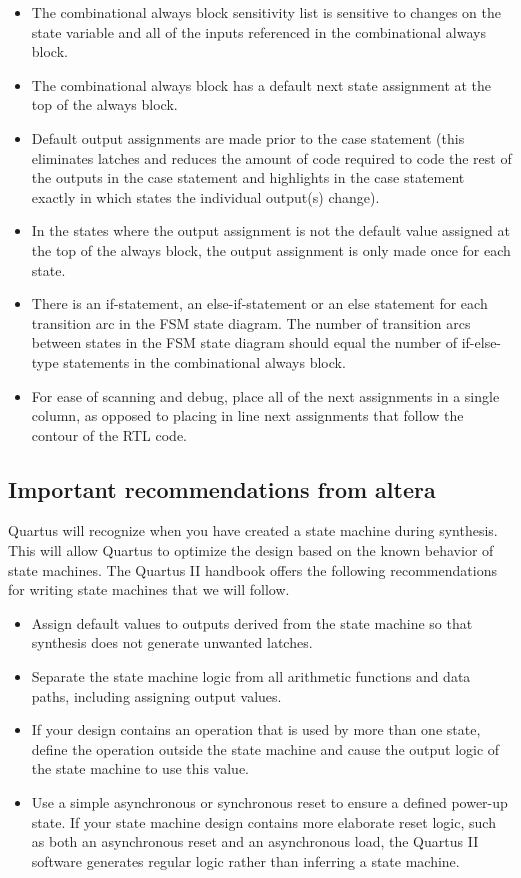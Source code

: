       \begin{itemize}
        \item The combinational always block sensitivity list is sensitive to changes on the state variable and all of the inputs referenced in the combinational always block.
        \item The combinational always block has a default next state assignment at the top of the always block.
        \item Default output assignments are made prior to the case statement (this eliminates latches and reduces the amount of code required to code the rest of the outputs in the case statement and highlights in the case statement exactly in which states the individual output(s) change).
        \item In the states where the output assignment is not the default value assigned at the top of the always block, the output assignment is only made once for each state.
        \item There is an if-statement, an else-if-statement or an else statement for each transition arc in the FSM state diagram. The number of transition arcs between states in the FSM state diagram should equal the number of if-else-type statements in the combinational always block.
        \item For ease of scanning and debug, place all of the next assignments in a single column, as opposed to placing in line next assignments that follow the contour of the RTL code.
      \end{itemize}

    \subsection{Important recommendations from altera}
      Quartus will recognize when you have created a state machine during synthesis. This will allow Quartus to optimize the design based on the known behavior of state machines. The Quartus II handbook offers the following recommendations for writing state machines that we will follow.
      \begin{itemize}
        \item Assign default values to outputs derived from the state machine so that synthesis does not generate unwanted latches.
        \item Separate the state machine logic from all arithmetic functions and data paths, including assigning output values.
        \item If your design contains an operation that is used by more than one state, define the operation outside the state machine and cause the output logic of the state machine to use this value.
        \item Use a simple asynchronous or synchronous reset to ensure a defined power-up state. If your state machine design contains more elaborate reset logic, such as both an asynchronous reset and an asynchronous load, the Quartus II software generates regular logic rather than inferring a state machine.
      \end{itemize}

